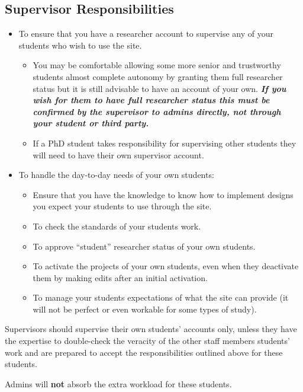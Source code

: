\documentclass[]{book}
\providecommand{\tightlist}{%
  \setlength{\itemsep}{0pt}\setlength{\parskip}{0pt}}
\begin{document}
\subsection*{Supervisor
Responsibilities}\label{supervisor-responsibilities}

\begin{itemize}
\tightlist
\item
  To ensure that you have a researcher account to supervise any of your
  students who wish to use the site.

  \begin{itemize}
  \tightlist
  \item
    You may be comfortable allowing some more senior and trustworthy
    students almost complete autonomy by granting them full researcher
    status but it is still advisable to have an account of your own.
    \textbf{\emph{If you wish for them to have full researcher status
    this must be confirmed by the supervisor to admins directly, not
    through your student or third party.}}
  \item
    If a PhD student takes responsibility for supervising other students
    they will need to have their own supervisor account.
  \end{itemize}
\item
  To handle the day-to-day needs of your own students:

  \begin{itemize}
  \tightlist
  \item
    Ensure that you have the knowledge to know how to implement designs
    you expect your students to use through the site.
  \item
    To check the standards of your students work.
  \item
    To approve ``student'' researcher status of your own students.
  \item
    To activate the projects of your own students, even when they
    deactivate them by making edits after an initial activation.
  \item
    To manage your students expectations of what the site can provide
    (it will not be perfect or even workable for some types of study).
  \end{itemize}
\end{itemize}

\begin{warning}
Supervisors should supervise their own students' accounts only, unless
they have the expertise to double-check the veracity of the other staff
members students' work and are prepared to accept the responsibilities
outlined above for these students.

Admins will \textbf{not} absorb the extra workload for these students.
\end{warning}
\end{document}
